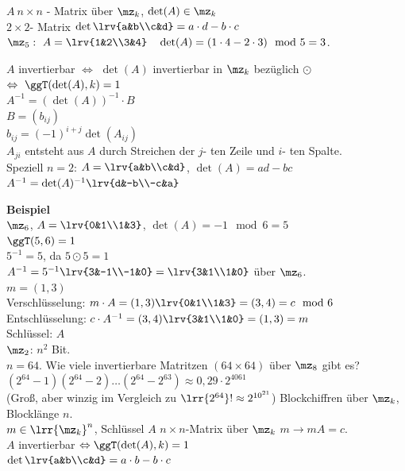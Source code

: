 		$A\ n\times n$ - Matrix über $\mz_k$, $\det(A)\in\mz_k$\\
		$2\times 2$- Matrix $\det\lrv{a&b\\c&d}=a\cdot d-b\cdot c$\\
		$\mz_5:\ A=\lrv{1&2\\3&4}\quad\det(A)=(1\cdot 4-2\cdot 3)\mod 5=3$.
		
		$A$ invertierbar $\Leftrightarrow$ $\det(A)$ invertierbar in $\mz_k$ bezüglich $\odot$ $\Leftrightarrow\ \ggT(\det(A),k)=1$\\
		$A^{-1}=(\det(A))^{-1}\cdot B$\\
		$B=(b_{ij})$\\
		$b_{ij}=(-1)^{i+j}\det(A_{ij})$\\
		$A_{ji}$ entsteht aus $A$ durch Streichen der $j$- ten Zeile und $i$- ten Spalte.\\
		Speziell $n=2$: $A=\lrv{a&b\\c&d}$, $\det(A)=ad-bc$\\
		$A^{-1}=\det(A)^{-1}\lrv{d&-b\\-c&a}$
		
		\textbf{Beispiel}\\
		$\mz_6$, $A=\lrv{0&1\\1&3}$, $\det(A)=-1\mod 6=5$\\
		$\ggT(5,6)=1$\\
		$5^{-1}=5$, da $5\odot 5=1$\\
		$A^{-1}=5^{-1}\lrv{3&-1\\-1&0}=\lrv{3&1\\1&0}$ über $\mz_6$.\\
		$m=(1,3)$\\
		Verschlüsselung: $m\cdot A=(1,3)\lrv{0&1\\1&3}=(3,4)=c\mod 6$\\
		Entschlüsselung: $c\cdot A^{-1}=(3,4)\lrv{3&1\\1&0}=(1, 3)=m$\\
		Schlüssel: $A$\\
		$\mz_2$: $n^2$ Bit.\\
		$n=64$. Wie viele invertierbare Matritzen $(64\times 64)$ über $\mz_8$ gibt es?\\
		$(2^{64}-1)(2^{64}-2)\dots(2^{64}-2^{63})\approx 0,29\cdot 2^{4061}$\\
		(Groß, aber winzig im Vergleich zu $\lrr{2^{64}}!\approx 2^{10^{21}}$)
\newpage	
		Blockchiffren über $\mz_k$, Blocklänge $n$.\\
		$m\in\lrr{\mz_k}^n$, Schlüssel $A$ $n\times n$-Matrix über $\mz_k$ $m\rightarrow mA=c$.\\
		$A$ invertierbar $\Leftrightarrow \ggT(\det(A), k)=1$\\
		$\det\lrv{a&b\\c&d}=a\cdot b-b\cdot c$
